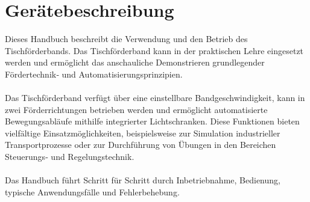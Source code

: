 %
%

\chapter{Gerätebeschreibung}
Dieses Handbuch beschreibt die Verwendung und den Betrieb des Tischförderbands. 
Das Tischförderband kann in der praktischen Lehre eingesetzt werden und ermöglicht das anschauliche Demonstrieren grundlegender Fördertechnik‑ und Automatisierungsprinzipien.
\\\\
Das Tischförderband verfügt über eine einstellbare Bandgeschwindigkeit, kann in zwei Förderrichtungen betrieben werden und ermöglicht automatisierte Bewegungsabläufe mithilfe integrierter Lichtschranken. 
Diese Funktionen bieten vielfältige Einsatzmöglichkeiten, beispielsweise zur Simulation industrieller Transportprozesse oder zur Durchführung von Übungen in den Bereichen Steuerungs‑ und Regelungstechnik.
\\\\
Das Handbuch führt Schritt für Schritt durch Inbetriebnahme, Bedienung, typische Anwendungsfälle und Fehlerbehebung.
